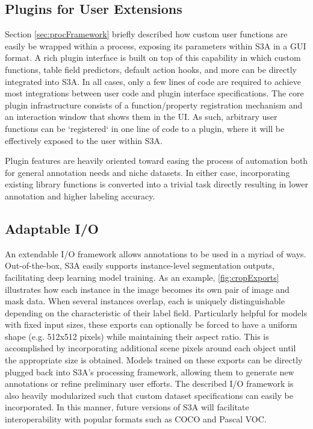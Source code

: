 \makeRegionAnalyticsFig

\subsection{Plugins for User Extensions}\label{sec:plugins}
Section \ref{sec:procFramework} briefly described how custom user functions are easily be wrapped within a process, exposing its parameters within S3A in a GUI format. A rich plugin interface is built on top of this capability in which custom functions, table field predictors, default action hooks, and more can be directly integrated into S3A. In all cases, only a few lines of code are required to achieve most integrations between user code and plugin interface specifications. The core plugin infrastructure consists of a function/property registration mechanism and an interaction window that shows them in the UI. As such, arbitrary user functions can be `registered` in one line of code to a plugin, where it will be effectively exposed to the user within S3A.


Plugin features are heavily oriented toward easing the process of automation both for general annotation needs and niche datasets. In either case, incorporating existing library functions is converted into a trivial task directly resulting in lower annotation and higher labeling accuracy.

\subsection{Adaptable I/O}
An extendable I/O framework allows annotations to be used in a myriad of ways. Out-of-the-box, S3A easily supports instance-level segmentation outputs, facilitating deep learning model training. As an example, \autoref{fig:cropExports} illustrates how each instance in the image becomes its own pair of image and mask data. When several instances overlap, each is uniquely distinguishable depending on the characteristic of their label field. Particularly helpful for models with fixed input sizes, these exports can optionally be forced to have a uniform shape (e.g. 512x512 pixels) while maintaining their aspect ratio. This is accomplished by incorporating additional scene pixels around each object until the appropriate size is obtained. Models trained on these exports can be directly plugged back into S3A's processing framework, allowing them to generate new annotations or refine preliminary user efforts. The described I/O framework is also heavily modularized such that custom dataset specifications can easily be incorporated. In this manner, future versions of S3A will facilitate interoperability with popular formats such as COCO and Pascal VOC.

